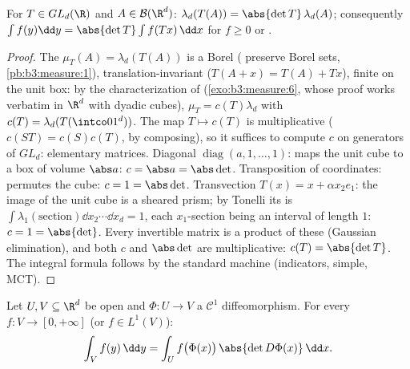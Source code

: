 \begin{theorem}
\label{thm:b3:product:linearchange}
For $T \in GL_d(\R)$ and $A \in \mathcal B(\R^d)$:
$\lambda_d(T(A)) = \abs{\det T}\,\lambda_d(A)$; consequently
$\int f(y)\dd y = \abs{\det T}\int f(Tx)\,\dd x$ for $f \geq 0$
or .
\end{theorem}

\begin{proof}
The  $\mu_T(A) = \lambda_d(T(A))$ is a Borel 
( preserve Borel sets,
\cref{pb:b3:measure:1}), translation-invariant
($T(A + x) = T(A) + Tx$), finite on the unit box: by the
characterization of 
(\cref{exo:b3:measure:6}, whose proof works verbatim in
$\R^d$ with dyadic cubes), $\mu_T = c(T)\lambda_d$ with $c(T)
= \lambda_d(T(\intco01^d))$. The map $T \mapsto c(T)$ is
multiplicative ($c(ST) = c(S)c(T)$, by composing), so it
suffices to compute $c$ on generators of $GL_d$: elementary
matrices. Diagonal $\operatorname{diag}(a, 1, \dots, 1)$:
maps the unit cube to a box of volume $\abs a$: $c = \abs a =
\abs\det$. Transposition of coordinates: permutes the cube: $c
= 1 = \abs\det$. Transvection $T(x) = x + \alpha
x_2e_1$: the image of the unit cube is a sheared prism; by
Tonelli its  is $\int\lambda_1(\text{section})\dd x_2
\cdots \dd x_d = 1$, each $x_1$-section being an interval of
length $1$: $c = 1 = \abs{\det}$. Every invertible matrix is a
product of these (Gaussian elimination), and both $c$ and
$\abs\det$ are multiplicative: $c(T) = \abs{\det T}$. The
integral formula follows by the standard machine (indicators,
simple, MCT).
\end{proof}

\begin{theorem}\label{thm:b3:product:changeofvar}
Let $U, V \subseteq \R^d$ be open and $\Phi \colon U \to V$ a
$\mathcal C^1$ diffeomorphism. For every  $f \colon V
\to [0, +\infty]$ (or $f \in L^1(V)$):
\[
\int_V f(y)\,\dd y = \int_U
f\bigl(\Phi(x)\bigr)\,\abs{\det D\Phi(x)}\,\dd x .
\]
\end{theorem}

